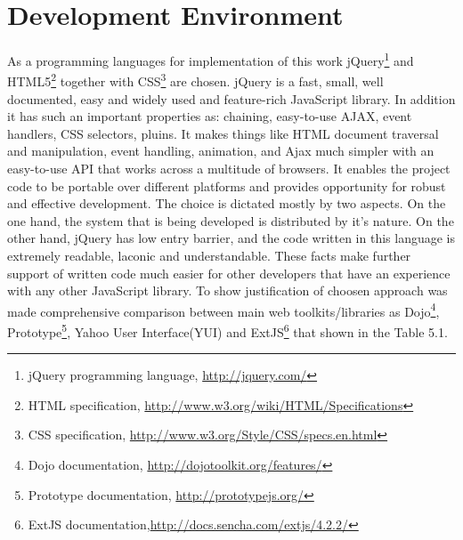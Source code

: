 \section{Development Environment}
	As a programming languages for implementation of this work jQuery\footnote{jQuery programming language, \url{http://jquery.com/}} and HTML5\footnote{HTML specification, \url{http://www.w3.org/wiki/HTML/Specifications}} together with CSS\footnote{CSS specification, \url{http://www.w3.org/Style/CSS/specs.en.html}} are chosen. jQuery is a fast, small, well documented, easy and widely used and feature-rich JavaScript library. In addition it has such an important properties as: chaining, easy-to-use AJAX, event handlers, CSS selectors, pluins. It makes things like HTML document traversal and manipulation, event handling, animation, and Ajax much simpler with an easy-to-use API that works across a multitude of browsers. It enables the project code to be portable over different platforms and provides opportunity for robust and effective development. The choice is dictated mostly by two aspects. On the one hand, the system that is being developed is distributed by it’s nature. On the other hand, jQuery has low entry barrier, and the code written in this language is extremely readable, laconic and understandable. These facts make further support of written code much easier for other developers that have an experience with any other JavaScript library. 
	\newline
	To show justification of choosen approach was made comprehensive comparison between main web toolkits/libraries as Dojo\footnote{Dojo documentation, \url{http://dojotoolkit.org/features/}}, Prototype\footnote{Prototype documentation, \url{http://prototypejs.org/}}, Yahoo User Interface(YUI) and ExtJS\footnote{ExtJS documentation,\url{http://docs.sencha.com/extjs/4.2.2/}} that shown in the Table 5.1. 
